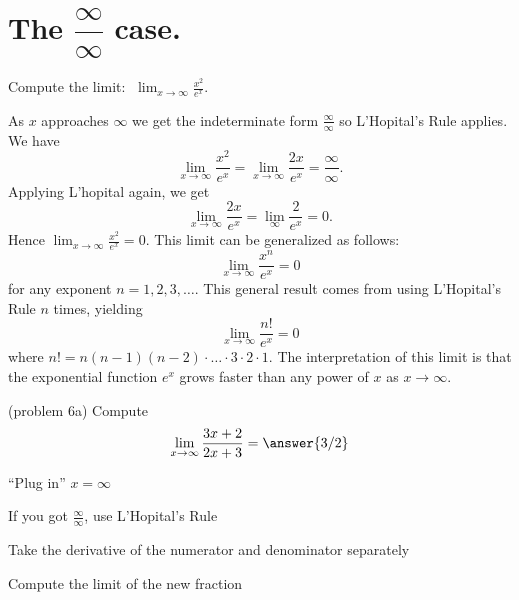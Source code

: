 \documentclass{ximera}
\begin{document}
\section{ The $\dfrac{\infty}{\infty}$ case.}



\begin{example}[example 6]
Compute the limit:  $\displaystyle{\;\lim_{x \to \infty} \frac{x^2}{e^x}}.$

As $x$ approaches $\infty$ we get the indeterminate form $\frac{\infty}{\infty}$ so L'Hopital's Rule applies.
We have 
\[\lim_{x\to \infty} \frac{x^2}{e^x} = \lim_{x \to \infty} \frac{2x}{e^x} = \frac{\infty}{\infty}.\]
Applying L'hopital again, we get
\[\lim_{x \to \infty} \frac{2x}{e^x} = \lim_{\infty} \frac{2}{e^x} = 0.\]
Hence $\lim_{x\to\infty}\frac{x^2}{e^x}=0$.  
This limit can be generalized as follows:
\[\lim_{x\to\infty}\frac{x^n}{e^x} =0\]
for any exponent $n = 1, 2, 3, \dots$.
This general result comes from using L'Hopital's Rule $n$ times, yielding
\[\lim_{x\to\infty} \frac{n!}{e^x} =0\]
where $n! = n(n-1)(n-2)\cdot \dots \cdot 3\cdot 2\cdot 1$.
The interpretation of this limit is that the exponential function $e^x$ grows faster than any power of $x$ as $x \to \infty$.
\end{example}




\begin{problem}(problem 6a)
  Compute
  \[
  \lim_{x \to \infty} \frac{3x+2}{2x + 3} = \answer{3/2}
  \]
  
    \begin{hint}
      ``Plug in'' $x=\infty$
    \end{hint}
    \begin{hint}
      If you got $\frac{\infty}{\infty}$, use L'Hopital's Rule
    \end{hint}
    \begin{hint}
      Take the derivative of the numerator and denominator separately
    \end{hint}
		\begin{hint}
      Compute the limit of the new fraction
    \end{hint}
	
\end{problem}
\end{document}
